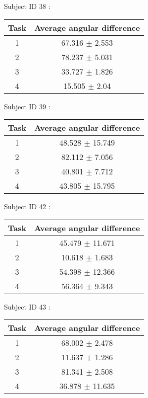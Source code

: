 \documentclass[12pt]{article}
\begin{document}
\par Subject ID  38 :
\begin{center}
\begin{tabular}{|c|c|}
\hline
 Task & Average angular difference \\ \hline
1  &  67.316 $\pm$ 2.553 \\
2  &  78.237 $\pm$ 5.031 \\
3  &  33.727 $\pm$ 1.826 \\
4  &  15.505 $\pm$ 2.04 \\
\hline
\end{tabular}
\end{center}

\par Subject ID  39 :
\begin{center}
\begin{tabular}{|c|c|}
\hline
 Task & Average angular difference \\ \hline
1  &  48.528 $\pm$ 15.749 \\
2  &  82.112 $\pm$ 7.056 \\
3  &  40.801 $\pm$ 7.712 \\
4  &  43.805 $\pm$ 15.795 \\
\hline
\end{tabular}
\end{center}

\par Subject ID  42 :
\begin{center}
\begin{tabular}{|c|c|}
\hline
 Task & Average angular difference \\ \hline
1  &  45.479 $\pm$ 11.671 \\
2  &  10.618 $\pm$ 1.683 \\
3  &  54.398 $\pm$ 12.366 \\
4  &  56.364 $\pm$ 9.343 \\
\hline
\end{tabular}
\end{center}

\par Subject ID  43 :
\begin{center}
\begin{tabular}{|c|c|}
\hline
 Task & Average angular difference \\ \hline
1  &  68.002 $\pm$ 2.478 \\
2  &  11.637 $\pm$ 1.286 \\
3  &  81.341 $\pm$ 2.508 \\
4  &  36.878 $\pm$ 11.635 \\
\hline
\end{tabular}
\end{center}
\end{document}
